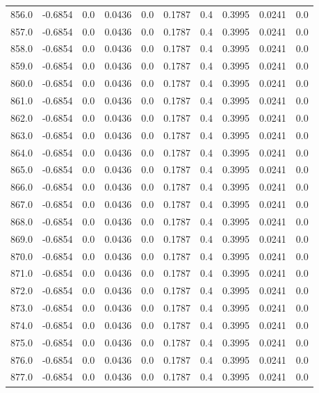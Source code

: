 \begin{longtable}{lrrrrrrrrr}
856.0 & -0.6854 & 0.0 & 0.0436 & 0.0 & 0.1787 & 0.4 & 0.3995 & 0.0241 & 0.0 \\
857.0 & -0.6854 & 0.0 & 0.0436 & 0.0 & 0.1787 & 0.4 & 0.3995 & 0.0241 & 0.0 \\
858.0 & -0.6854 & 0.0 & 0.0436 & 0.0 & 0.1787 & 0.4 & 0.3995 & 0.0241 & 0.0 \\
859.0 & -0.6854 & 0.0 & 0.0436 & 0.0 & 0.1787 & 0.4 & 0.3995 & 0.0241 & 0.0 \\
860.0 & -0.6854 & 0.0 & 0.0436 & 0.0 & 0.1787 & 0.4 & 0.3995 & 0.0241 & 0.0 \\
861.0 & -0.6854 & 0.0 & 0.0436 & 0.0 & 0.1787 & 0.4 & 0.3995 & 0.0241 & 0.0 \\
862.0 & -0.6854 & 0.0 & 0.0436 & 0.0 & 0.1787 & 0.4 & 0.3995 & 0.0241 & 0.0 \\
863.0 & -0.6854 & 0.0 & 0.0436 & 0.0 & 0.1787 & 0.4 & 0.3995 & 0.0241 & 0.0 \\
864.0 & -0.6854 & 0.0 & 0.0436 & 0.0 & 0.1787 & 0.4 & 0.3995 & 0.0241 & 0.0 \\
865.0 & -0.6854 & 0.0 & 0.0436 & 0.0 & 0.1787 & 0.4 & 0.3995 & 0.0241 & 0.0 \\
866.0 & -0.6854 & 0.0 & 0.0436 & 0.0 & 0.1787 & 0.4 & 0.3995 & 0.0241 & 0.0 \\
867.0 & -0.6854 & 0.0 & 0.0436 & 0.0 & 0.1787 & 0.4 & 0.3995 & 0.0241 & 0.0 \\
868.0 & -0.6854 & 0.0 & 0.0436 & 0.0 & 0.1787 & 0.4 & 0.3995 & 0.0241 & 0.0 \\
869.0 & -0.6854 & 0.0 & 0.0436 & 0.0 & 0.1787 & 0.4 & 0.3995 & 0.0241 & 0.0 \\
870.0 & -0.6854 & 0.0 & 0.0436 & 0.0 & 0.1787 & 0.4 & 0.3995 & 0.0241 & 0.0 \\
871.0 & -0.6854 & 0.0 & 0.0436 & 0.0 & 0.1787 & 0.4 & 0.3995 & 0.0241 & 0.0 \\
872.0 & -0.6854 & 0.0 & 0.0436 & 0.0 & 0.1787 & 0.4 & 0.3995 & 0.0241 & 0.0 \\
873.0 & -0.6854 & 0.0 & 0.0436 & 0.0 & 0.1787 & 0.4 & 0.3995 & 0.0241 & 0.0 \\
874.0 & -0.6854 & 0.0 & 0.0436 & 0.0 & 0.1787 & 0.4 & 0.3995 & 0.0241 & 0.0 \\
875.0 & -0.6854 & 0.0 & 0.0436 & 0.0 & 0.1787 & 0.4 & 0.3995 & 0.0241 & 0.0 \\
876.0 & -0.6854 & 0.0 & 0.0436 & 0.0 & 0.1787 & 0.4 & 0.3995 & 0.0241 & 0.0 \\
877.0 & -0.6854 & 0.0 & 0.0436 & 0.0 & 0.1787 & 0.4 & 0.3995 & 0.0241 & 0.0 \\

\end{longtable}
